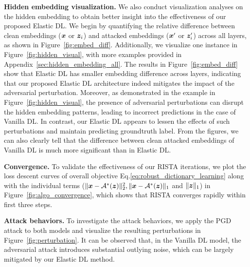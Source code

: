 \textbf{Hidden embedding visualization.}
We also conduct visualization analyses on the hidden embedding to obtain better insight into the effectiveness of our proposed Elastic DL. We begin by quantifying the relative difference between clean embeddings (${\bm{x}}$ or ${\bm{z}}_i$) and attacked embeddings (${\bm{x}}'$ or ${\bm{z}}'_i$) across all layers, as shown in Figure~\ref{fig:embed_diff}. Additionally, we visualize one instance in Figure~\ref{fig:hidden_visual}, with more examples provided in Appendix~\ref{sec:hidden_embedding_all}.
The results in Figure~\ref{fig:embed_diff} show that Elastic DL has smaller embedding difference across  layers, indicating that our proposed Elastic DL architecture indeed mitigates the impact of the adversarial perturbation. Moreover, 
as demonstrated in the example 
in Figure~\ref{fig:hidden_visual}, the presence of adversarial perturbations can disrupt the hidden embedding patterns, leading to incorrect predictions in the case of Vanilla DL. 
In contrast, our Elastic DL appears to lessen the effects of such perturbations and maintain predicting groundtruth label. From the figures, we can also clearly tell that the difference between clean attacked embeddings of Vanilla DL is much more significant than  in  Elastic DL.








\textbf{Convergence.} 
To validate the effectiveness of our RISTA iterations, we plot the loss descent curves of overall objective Eq.\eqref{eq:robust_dictionary_learning} along with the individual terms ($\|{\bm{x}} - {\mathcal{A}}^*({\bm{z}})\|_2^2, \|{\bm{x}} - {\mathcal{A}}^*({\bm{z}})\|_1$ and $ \|{\bm{z}}\|_1$) in Figure~\ref{fig:algo_convergence}, which shows 
that RISTA converges rapidly within first three steps.





\textbf{Attack behaviors.}
To investigate the attack behaviors, we apply the PGD attack to both models and visualize the resulting perturbations in Figure~\ref{fig:perturbation}. It can be observed that, in the Vanilla DL model, the adversarial attack introduces substantial outlying noise, which can be largely mitigated by our Elastic DL method.





